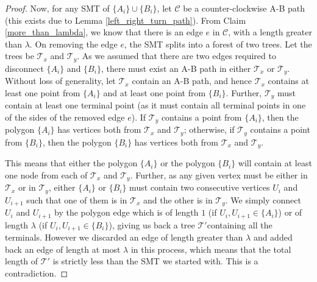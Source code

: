 \begin{proof}
        Now, for any SMT of $\{A_i\} \cup \{B_i\}$, let $\mathcal C$ be a counter-clockwise A-B path (this exists due to Lemma \ref{left_right_turn_path}). From Claim \ref{more_than_lambda}, we know that there is an edge $e$ in $\mathcal C$, with a length greater than $\lambda$. On removing the edge $e$, the SMT splits into a forest of two trees. Let the trees be $\mathcal T_x$ and $\mathcal T_y$. As we assumed that there are two edges required to disconnect $\{A_i\}$ and $\{B_i\}$, there must exist an A-B path in either $\mathcal T_x$ or $\mathcal T_y$. Without loss of generality, let $\mathcal T_x$ contain an A-B path, and hence $\mathcal T_x$ contains at least one point from $\{A_i\}$ and at least one point from $\{B_i\}$. Further, $\mathcal T_y$ must contain at least one terminal point (as it must contain all terminal points in one of the sides of the removed edge $e$). If $\mathcal T_y$ contains a point from $\{A_i\}$, then the polygon $\{A_i\}$ has vertices both from $\mathcal T_x$ and $\mathcal T_y$; otherwise, if $\mathcal T_y$ contains a point from $\{B_i\}$, then the polygon $\{B_i\}$ has vertices both from $\mathcal T_x$ and $\mathcal T_y$. 
        
        This means that either the polygon $\{A_i\}$ or the polygon $\{B_i\}$ will contain at least one node from each of $\mathcal T_x$ and $\mathcal T_y$. Further, as any given vertex must be either in $\mathcal T_x$ or in $\mathcal T_y$, either $\{A_i\}$ or $\{B_i\}$ must contain two consecutive vertices $U_i$ and $U_{i + 1}$ such that one of them is in $\mathcal T_x$ and the other is in $\mathcal T_y$. We simply connect $U_i$ and $U_{i + 1}$ by the polygon edge which is of length $1$ (if $U_i, U_{i + 1} \in \{A_i\}$) or of length $\lambda$ (if $U_i, U_{i + 1} \in \{B_i\}$), giving us back a tree $\mathcal{T}'$containing all the terminals. However we discarded an edge of length greater than $\lambda$ and added back an edge of length at most $\lambda$ in this process, which means that the total length of $\mathcal{T}'$ is strictly less than the SMT we started with. This is a contradiction.
\end{proof}


